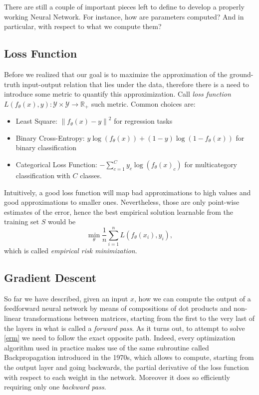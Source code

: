 \documentclass[LaM,binding=0.6cm]{./packages/sapthesis/sapthesis}
\newcommand{\norm}[1]{\left\lVert#1\right\rVert}
\begin{document}
            There are still a couple of important pieces left to define to develop a properly working Neural Network. For instance, how are parameters computed? And in particular, with respect to what we compute them? 
            \subsection{Loss Function}
                Before we realized that our goal is to maximize the approximation of the ground-truth input-output relation that lies under the data, therefore there is a need to
                introduce some metric to quantify this approximization. Call \textit{loss function} $ L(f_{\theta}\left(x\right), y) \colon \mathcal{Y} \times \mathcal{Y} \to \mathbb{R_+}$ 
                such metric. Common choices are:
                \begin{itemize}
                    \item Least Square: $\norm{f_{\theta}\left(x\right) - y}^2$ for regression tasks 
                    \item Binary Cross-Entropy: $y \log (f_{\theta}(x))+(1-y) \log (1-f_{\theta}(x))$ for binary classification  
                    \item Categorical Loss Function: $-\sum_{c=1}^{C} y_{c} \log \left(f_{\theta}(x)_c\right)$ for multicategory classification with $C$ classes.
                \end{itemize}
                Intuitively, a good loss function will map bad approximations to high values and good approximations to smaller ones.
                Nevertheless, those are only point-wise estimates of the error, hence the best empirical solution learnable from the training set $ S $ would be 
                \begin{equation}
                    \label{erm}
                    \displaystyle{  \min_{\theta}  \frac{1}{n} \sum_{i=1}^{n} L\left(f_{\theta}\left(x_{i}\right), y_{i}\right) },
                \end{equation}
                which is called \textit{empirical risk minimization}.
            \subsection{Gradient Descent}
               So far we have described, given an input $ x $, how we can compute the output of a feedforward neural network by means of compositions of dot products 
               and non-linear transformations between matrices, starting from the first to the very last of the layers in what is called a \textit{forward pass}. As it turns out, to attempt to solve \ref{erm} we need to follow the exact
               opposite path. Indeed, every optimization algorithm used in practice makes use of the same subroutine called Backpropagation \cite{backprop} introduced in the 1970s, which allows to compute, starting from the output layer
               and going backwards, the partial derivative of the loss function with respect to each weight in the network. Moreover it does so efficiently requiring only one \textit{backward pass}.
\end{document}

